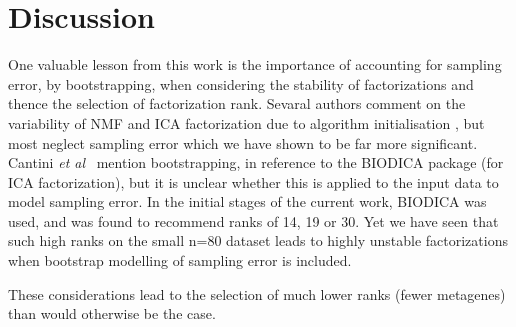 \documentclass[draft, tikz, 12pt,a4paper,oneside,fleqn]{article}
\newcommand{\etal}{{\em et al\/}}
\begin{document}
\clearpage
\section{Discussion}

One valuable lesson from this work is the importance of accounting for sampling error, by bootstrapping,  when considering the stability of factorizations and thence the selection of factorization rank.    Sevaral authors comment on the variability of NMF and ICA factorization due to algorithm initialisation \cite{Kairov2017,Sompairac2019,WayGregory2019}, but most neglect sampling error which we have shown to be far more significant.   Cantini \etal\ \cite{Cantini2019a} mention bootstrapping, in reference to the BIODICA package (for ICA factorization), but it is unclear whether this is applied to the input data to model sampling error.  In the initial stages of the current work, BIODICA was used, and was found to recommend ranks of 14, 19 or 30.  Yet we have seen that such high ranks on the small n=80 dataset leads to highly unstable factorizations when bootstrap modelling of sampling error is included.

These considerations lead to the selection of much lower ranks (fewer metagenes) than would otherwise be the case.
\end{document}
